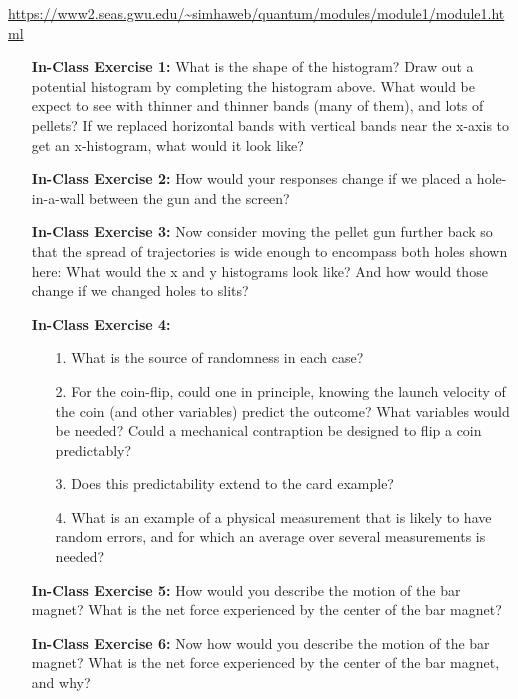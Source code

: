 \documentclass[main.tex]{subfiles}
\begin{document}
\url{https://www2.seas.gwu.edu/~simhaweb/quantum/modules/module1/module1.html}

\begin{enumerate}

\item[] \textbf{In-Class Exercise 1:}  What is the shape of the histogram? Draw out a potential histogram by completing the histogram above. What would be expect to see with thinner and thinner bands (many of them), and lots of pellets? If we replaced horizontal bands with vertical bands near the x-axis to get an x-histogram, what would it look like? 

\item[] \textbf{In-Class Exercise 2:} How would your responses change if we placed a hole-in-a-wall between the gun and the screen?

\item[] \textbf{In-Class Exercise 3:} Now consider moving the pellet gun further back so that the spread of trajectories is wide enough to encompass both holes shown here: What would the x and y histograms look like? And how would those change if we changed holes to slits?

\item[] \textbf{In-Class Exercise 4:}

    \begin{enumerate}
        \item[1.] What is the source of randomness in each case?
        \item[2.] For the coin-flip, could one in principle, knowing the launch velocity of the coin (and other variables) predict the outcome? What variables would be needed? Could a mechanical contraption be designed to flip a coin predictably?
        \item[3.] Does this predictability extend to the card example?
        \item[4.] What is an example of a physical measurement that is likely to have random errors, and for which an average over several measurements is needed?
    \end{enumerate}

\item[] \textbf{In-Class Exercise 5:} How would you describe the motion of the bar magnet? What is the net force experienced by the center of the bar magnet?

\item[] \textbf{In-Class Exercise 6:} Now how would you describe the motion of the bar magnet? What is the net force experienced by the center of the bar magnet, and why?


\end{enumerate}
\end{document}
